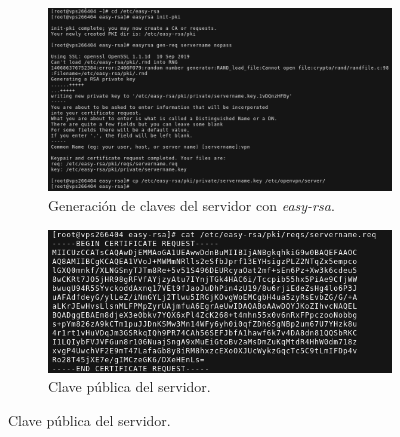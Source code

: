 \documentclass[a4paper, 11pt, titlepage]{article}
\begin{document}
            \begin{figure}[htp]
            \centering
                \begin{subfigure}[b]{1\linewidth}
                \includegraphics[width=1\textwidth]{resources/ca09.png}
                \caption{Generación de claves del servidor con \textit{easy-rsa}.}
                \end{subfigure}
            
                \begin{subfigure}[b]{0.7\linewidth}
                \includegraphics[width=1\textwidth]{resources/ca10.png}
                \caption{Clave pública del servidor.}
                \end{subfigure}
        

\end{figure}
\end{document}

